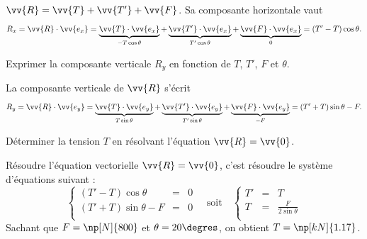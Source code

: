 \begin{corrige}
	$\vv{R}=\vv{T}+\vv{T'}+\vv{F}$. Sa composante horizontale vaut 
	\[
		R_x=\vv{R}\cdot \vv{e_x}=
		\underbrace{\vv{T}\cdot \vv{e_x}}_{-T\cos\theta}+
		\underbrace{\vv{T'}\cdot \vv{e_x}}_{T'\cos\theta}+
		\underbrace{\vv{F}\cdot \vv{e_x}}_{0}
		=(T'-T)\cos\theta.
	\]
\end{corrige}




\begin{enonce}
	 Exprimer la composante verticale $R_y$ en fonction de $T$, $T'$, $F$ et $\theta$.
\end{enonce}


\begin{corrige}
	La composante verticale de $\vv{R}$ s'écrit 
	\[
		R_y=\vv{R}\cdot \vv{e_y}=
		\underbrace{\vv{T}\cdot \vv{e_y}}_{T\sin\theta}+
		\underbrace{\vv{T'}\cdot \vv{e_y}}_{T'\sin\theta}+
		\underbrace{\vv{F}\cdot \vv{e_y}}_{-F}
		=(T'+T)\sin\theta-F.
	\]
\end{corrige}





\begin{enonce}
Déterminer la tension $T$ en résolvant l'équation $\vv{R}=\vv{0}$.
\end{enonce}


\begin{corrige}
	Résoudre l'équation vectorielle $\vv{R}=\vv{0}$, c'est résoudre le système d'équations suivant :
	\[
		\left\{\begin{array}{rcl}
			(T'-T)\cos\theta	&=& 0\\
			(T'+T)\sin\theta-F	&=& 0\\
		\end{array}	\right.
		\quad\text{soit}\quad
		\left\{\begin{array}{rcl}
			T'	&=& T\\
			T	&=& \frac{F}{2\sin\theta}\\
		\end{array}	\right.
	\]
	Sachant que $F=\np[N]{800}$ et $\theta=20\degres$, on obtient $T=\np[kN]{1.17}$.
\end{corrige}

